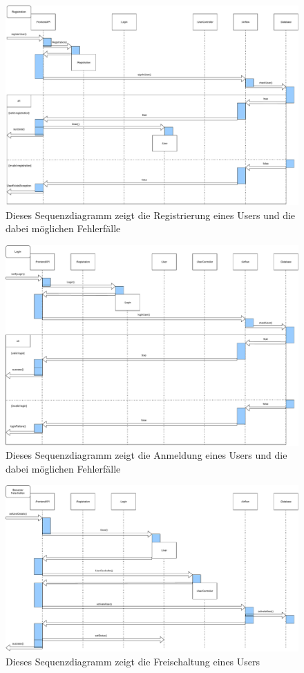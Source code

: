 \begin{figure}[H]
	\centering
	\includegraphics[width=\textwidth]{res/RegistrationSequence.pdf} 
	\caption{Dieses Sequenzdiagramm zeigt die Registrierung eines Users und die dabei möglichen Fehlerfälle}
\end{figure}

\begin{figure}[H]
	\centering
	\includegraphics[width=\textwidth]{res/LoginSequence.pdf} 
	\caption{Dieses Sequenzdiagramm zeigt die Anmeldung eines Users und die dabei möglichen Fehlerfälle}
\end{figure}

\begin{figure}[H]
	\centering
	\includegraphics[width=\textwidth]{res/BenutzerFreischaltenSequence.pdf} 
	\caption{Dieses Sequenzdiagramm zeigt die Freischaltung eines Users}
\end{figure}